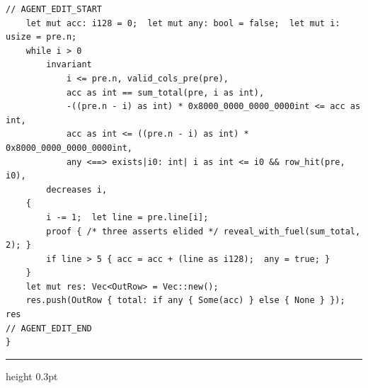 \begin{minipage}[c]{0.74\textwidth}
\begin{lstlisting}[style=lemmacode]
// AGENT_EDIT_START
    let mut acc: i128 = 0;  let mut any: bool = false;  let mut i: usize = pre.n;
    while i > 0
        invariant
            i <= pre.n, valid_cols_pre(pre),
            acc as int == sum_total(pre, i as int),
            -((pre.n - i) as int) * 0x8000_0000_0000_0000int <= acc as int,
            acc as int <= ((pre.n - i) as int) * 0x8000_0000_0000_0000int,
            any <==> exists|i0: int| i as int <= i0 && row_hit(pre, i0),
        decreases i,
    {
        i -= 1;  let line = pre.line[i];
        proof { /* three asserts elided */ reveal_with_fuel(sum_total, 2); }
        if line > 5 { acc = acc + (line as i128);  any = true; }
    }
    let mut res: Vec<OutRow> = Vec::new();
    res.push(OutRow { total: if any { Some(acc) } else { None } });  res
// AGENT_EDIT_END
}
\end{lstlisting}\end{minipage}\par\vspace{2pt}\hrule height 0.3pt\vspace{2pt}
